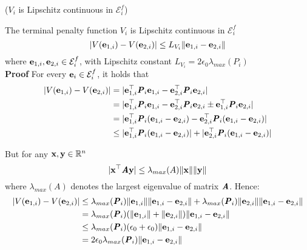 \begin{bw_box}
\begin{lemma} ($V_i$ is Lipschitz continuous in $\mathcal{E}_i^f$)

  The terminal penalty function $V_i$ is Lipschitz continuous in
  $\mathcal{E}_i^f$
  $$|V(\bm{\mathbf{e}}_{1,i}) - V(\bm{\mathbf{e}}_{2,i})| \leq L_{V_i} \|\bm{\mathbf{e}}_{1,i} - \bm{\mathbf{e}}_{2,i}\|$$
  where $\bm{\mathbf{e}}_{1,i}, \bm{\mathbf{e}}_{2,i} \in \mathcal{E}_i^f$,
  with Lipschitz constant $L_{V_i} = 2 \epsilon_0 \lambda_{max}(P_i)$\\

  \textbf{Proof} For every $\bm{\mathbf{e}}_i \in \mathcal{E}_i^f$, it holds that
  \begin{align}
    |V(\bm{\mathbf{e}}_{1,i}) - V(\bm{\mathbf{e}}_{2,i})| &= |\bm{\mathbf{e}}_{1,i}^{\top} \bm{\mathit{P}}_i \bm{\mathbf{e}}_{1,i} - \bm{\mathbf{e}}_{2,i}^{\top} \bm{\mathit{P}}_i \bm{\mathbf{e}}_{2,i}| \\
      &= |\bm{\mathbf{e}}_{1,i}^{\top} \bm{\mathit{P}}_i \bm{\mathbf{e}}_{1,i} - \bm{\mathbf{e}}_{2,i}^{\top} \bm{\mathit{P}}_i \bm{\mathbf{e}}_{2,i} \pm \bm{\mathbf{e}}_{1,i}^{\top} \bm{\mathit{P}}_i \bm{\mathbf{e}}_{2,i}| \\
      &= |\bm{\mathbf{e}}_{1,i}^{\top} \bm{\mathit{P}}_i (\bm{\mathbf{e}}_{1,i}-\bm{\mathbf{e}}_{2,i}) - \bm{\mathbf{e}}_{2,i}^{\top} \bm{\mathit{P}}_i (\bm{\mathbf{e}}_{1,i}-\bm{\mathbf{e}}_{2,i})| \\
      &\leq |\bm{\mathbf{e}}_{1,i}^{\top} \bm{\mathit{P}}_i (\bm{\mathbf{e}}_{1,i}-\bm{\mathbf{e}}_{2,i})| + |\bm{\mathbf{e}}_{2,i}^{\top} \bm{\mathit{P}}_i (\bm{\mathbf{e}}_{1,i}-\bm{\mathbf{e}}_{2,i})|
  \end{align}

  But for any $\bm{\mathbf{x}}, \bm{\mathbf{y}} \in \mathbb{R}^n$
  $$|\bm{\mathbf{x}}^{\top} \bm{\mathit{A}} \bm{\mathbf{y}}| \leq \lambda_{max}(A) \|\bm{\mathbf{x}}\| \|\bm{\mathbf{y}}\|$$
  where $\lambda_{max}(A)$ denotes the largest eigenvalue of matrix $\bm{\mathit{A}}$.
  Hence:
  \begin{align}
    |V(\bm{\mathbf{e}}_{1,i}) - V(\bm{\mathbf{e}}_{2,i})| &\leq
    \lambda_{max}(\bm{\mathit{P}}_i) \|\bm{\mathbf{e}}_{1,i}\| \|\bm{\mathbf{e}}_{1,i} - \bm{\mathbf{e}}_{2,i}\| +
    \lambda_{max}(\bm{\mathit{P}}_i) \|\bm{\mathbf{e}}_{2,i}\| \|\bm{\mathbf{e}}_{1,i} - \bm{\mathbf{e}}_{2,i}\| \\
    &= \lambda_{max}(\bm{\mathit{P}}_i) (\|\bm{\mathbf{e}}_{1,i}\| + \|\bm{\mathbf{e}}_{2,i}\|)\|\bm{\mathbf{e}}_{1,i} - \bm{\mathbf{e}}_{2,i}\| \\
    & \leq \lambda_{max}(\bm{\mathit{P}}_i) (\epsilon_0 + \epsilon_0)\|\bm{\mathbf{e}}_{1,i} - \bm{\mathbf{e}}_{2,i}\| \\
    &= 2 \epsilon_0 \lambda_{max}(\bm{\mathit{P}}_i) \|\bm{\mathbf{e}}_{1,i} - \bm{\mathbf{e}}_{2,i}\|
  \end{align}
  \qedsymbol
\label{lemma:V_Lipschitz_e_0}
\end{lemma}
\end{bw_box}


